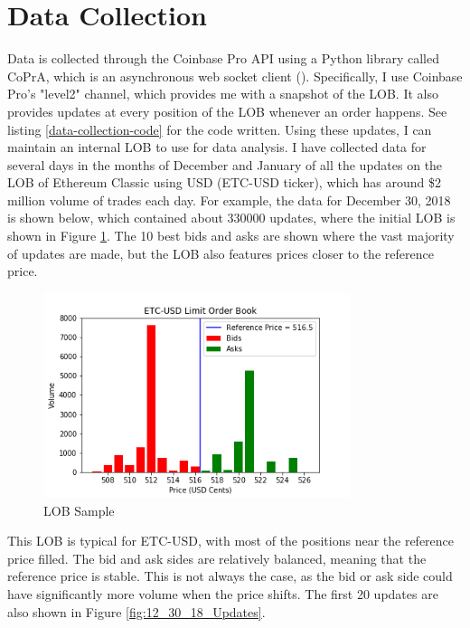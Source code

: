 \section{Data Collection}
Data is collected through the Coinbase Pro API using a Python library called CoPrA, which is an asynchronous web socket client (\cite{L3}). Specifically, I use Coinbase Pro's "level2" channel, which provides me with a snapshot of the LOB. It also provides updates at every position of the LOB whenever an order happens. See listing \ref{data-collection-code} for the code written. Using these updates, I can maintain an internal LOB to use for data analysis. I have collected data for several days in the months of December and January of all the updates on the LOB of Ethereum Classic using USD (ETC-USD ticker), which has around \$2 million volume of trades each day. For example, the data for December 30, 2018 is shown below, which contained about 330000 updates, where the initial LOB is shown  in Figure \ref{fig:12_30_18_LOB_pic}. The 10 best bids and asks are shown where the vast majority of updates are made, but the LOB also features prices closer to the reference price.

\begin{figure}[t]
\begin{center}
\includegraphics[width=0.8\textwidth]{Figures/12_30_18_LOB.png}
\caption{LOB Sample}
\label{fig:12_30_18_LOB_pic}
\end{center}
\end{figure}

This LOB is typical for ETC-USD, with most of the positions near the reference price filled. The bid and ask sides are relatively balanced, meaning that the reference price is stable. This is not always the case, as the bid or ask side could have significantly more volume when the price shifts. The first 20 updates are also shown in Figure \ref{fig:12_30_18_Updates}.

